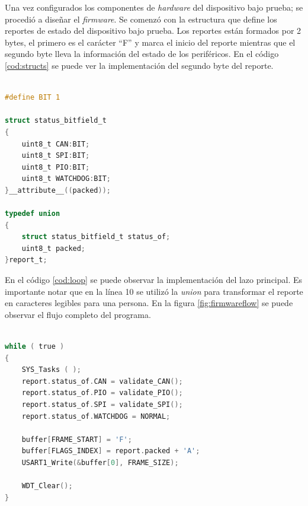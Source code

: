 Una vez configurados los componentes de \emph{hardware} del dispositivo bajo prueba; se procedió a diseñar el \emph{firmware}.
Se comenzó con la estructura que define los reportes de estado del dispositivo bajo prueba.
Los reportes están formados por 2 bytes, el primero es el carácter ``F'' y marca el inicio del reporte mientras que el segundo byte lleva la información del estado de los periféricos.
En el código \ref{cod:structs} se puede ver la implementación del segundo byte del reporte.

\begin{lstlisting}[language=C,label=cod:structs,caption=Definición de la estructura de reportes.]  % Start your code-block

#define BIT 1

struct status_bitfield_t
{
    uint8_t CAN:BIT;
    uint8_t SPI:BIT;
    uint8_t PIO:BIT;
    uint8_t WATCHDOG:BIT;
}__attribute__((packed));

typedef union
{
    struct status_bitfield_t status_of;
    uint8_t packed;
}report_t;

\end{lstlisting}

En el código \ref{cod:loop} se puede observar la implementación del lazo principal.
Es importante notar que en la línea 10 se utilizó la \emph{union} para transformar el reporte en caracteres legibles para una persona.
En la figura \ref{fig:firmwareflow} se puede observar el flujo completo del programa.

\begin{lstlisting}[language=C,label=cod:loop,caption=Lazo principal del \emph{firmware} de autoevaluación.]  % Start your code-block

while ( true )
{
    SYS_Tasks ( );
    report.status_of.CAN = validate_CAN();
    report.status_of.PIO = validate_PIO();
    report.status_of.SPI = validate_SPI();
    report.status_of.WATCHDOG = NORMAL;
    
    buffer[FRAME_START] = 'F';
    buffer[FLAGS_INDEX] = report.packed + 'A';
    USART1_Write(&buffer[0], FRAME_SIZE);
    
    WDT_Clear();
}

\end{lstlisting}

